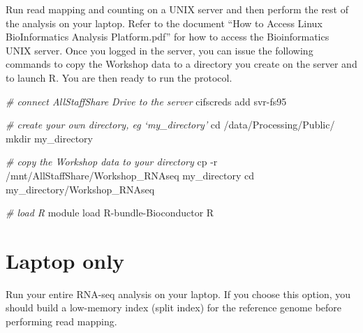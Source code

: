 \documentclass[]{book}
\newenvironment{Shaded}{\begin{snugshade}}{\end{snugshade}}
\newcommand{\BuiltInTok}[1]{#1}
\newcommand{\CommentTok}[1]{\textcolor[rgb]{0.56,0.35,0.01}{\textit{#1}}}
\newcommand{\ExtensionTok}[1]{#1}
\newcommand{\FunctionTok}[1]{\textcolor[rgb]{0.00,0.00,0.00}{#1}}
\newcommand{\NormalTok}[1]{#1}
\begin{document}
Run read mapping and counting on a UNIX server and then perform the rest of the analysis on your laptop. Refer to the document ``How to Access Linux BioInformatics Analysis Platform.pdf'' for how to access the Bioinformatics UNIX server. Once you logged in the server, you can issue the following commands to copy the Workshop data to a directory you create on the server and to launch R. You are then ready to run the protocol.

\begin{Shaded}
\begin{Highlighting}[]
\CommentTok{# connect AllStaffShare Drive to the server}
\ExtensionTok{cifscreds}\NormalTok{ add svr-fs95}
\end{Highlighting}
\end{Shaded}

\begin{Shaded}
\begin{Highlighting}[]
\CommentTok{# create your own directory, eg ‘my_directory’}
\BuiltInTok{cd}\NormalTok{ /data/Processing/Public/}
\FunctionTok{mkdir}\NormalTok{ my_directory}
\end{Highlighting}
\end{Shaded}

\begin{Shaded}
\begin{Highlighting}[]
\CommentTok{# copy the Workshop data to your directory}
\FunctionTok{cp}\NormalTok{ -r /mnt/AllStaffShare/Workshop_RNAseq my_directory}
\BuiltInTok{cd}\NormalTok{ my_directory/Workshop_RNAseq}
\end{Highlighting}
\end{Shaded}

\begin{Shaded}
\begin{Highlighting}[]
\CommentTok{# load R}
\ExtensionTok{module}\NormalTok{ load R-bundle-Bioconductor}
\ExtensionTok{R}
\end{Highlighting}
\end{Shaded}

\hypertarget{laptop-only}{%
\section{Laptop only}\label{laptop-only}}

Run your entire RNA-seq analysis on your laptop. If you choose this option, you should build a low-memory index (split index) for the reference genome before performing read mapping.
\end{document}
